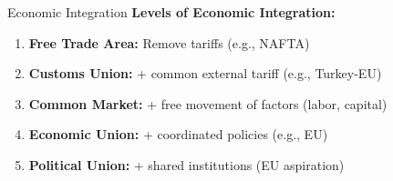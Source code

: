\documentclass{beamer}
\begin{document}

\begin{frame}{Economic Integration}
\textbf{Levels of Economic Integration:}
\begin{enumerate}
    \item \textbf{Free Trade Area:} Remove tariffs (e.g., NAFTA)
    \item \textbf{Customs Union:} + common external tariff (e.g., Turkey-EU)
    \item \textbf{Common Market:} + free movement of factors (labor, capital)
    \item \textbf{Economic Union:} + coordinated policies (e.g., EU)
    \item \textbf{Political Union:} + shared institutions (EU aspiration)
\end{enumerate}
\end{frame}
\end{document}
